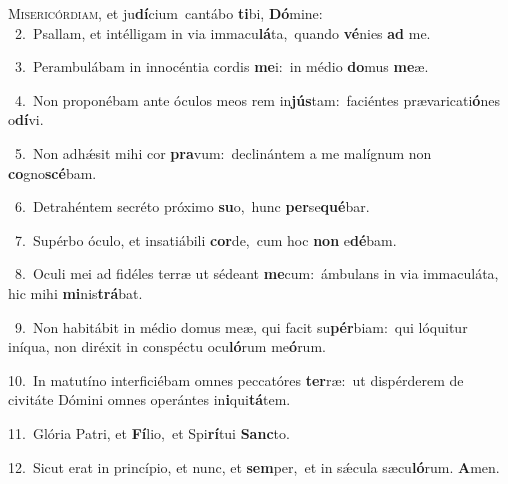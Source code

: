 \lettrine{\initial\textcolor{\initialcolor}{M}}{isericórdiam,} et ju\-\textbf{dí}\-cium~\star cantábo \textbf{ti}\-bi, \textbf{Dó}\-mine:\\
{\numbfont\textcolor{\numbcolor}{~2.}}~Psallam, et intélligam in via immacu\-\textbf{lá}\-ta,~\star quando \textbf{vé}\-nies \textbf{ad} me.\par
{\numbfont\textcolor{\numbcolor}{~3.}}~Perambulábam in innocéntia cordis \textbf{me}\-i:~\star in médio \textbf{do}\-mus \textbf{me}\-æ.\par
{\numbfont\textcolor{\numbcolor}{~4.}}~Non proponébam ante óculos meos rem in\-\textbf{jús}\-tam:~\star faciéntes prævaricati\-\textbf{ó}\-nes o\-\textbf{dí}\-vi.\par
{\numbfont\textcolor{\numbcolor}{~5.}}~Non adhǽsit mihi cor \textbf{pra}\-vum:~\star declinántem a me malígnum non \textbf{co}\-gno\-\textbf{scé}\-bam.\par
{\numbfont\textcolor{\numbcolor}{~6.}}~Detrahéntem secréto próximo \textbf{su}\-o,~\star hunc \textbf{per}\-se\-\textbf{qué}\-bar.\par
{\numbfont\textcolor{\numbcolor}{~7.}}~Supérbo óculo, et insatiábili \textbf{cor}\-de,~\star cum hoc \textbf{non} e\-\textbf{dé}\-bam.\par
{\numbfont\textcolor{\numbcolor}{~8.}}~Oculi mei ad fidéles terræ ut sédeant \textbf{me}\-cum:~\star ámbulans in via immaculáta, hic mihi \textbf{mi}\-nis\-\textbf{trá}\-bat.\par
{\numbfont\textcolor{\numbcolor}{~9.}}~Non habitábit in médio domus meæ, qui facit su\-\textbf{pér}\-biam:~\star qui lóquitur iníqua, non diréxit in conspéctu ocu\-\textbf{ló}\-rum me\-\textbf{ó}\-rum.\par
{\numbfont\textcolor{\numbcolor}{10.}}~In matutíno interficiébam omnes peccatóres \textbf{ter}\-ræ:~\star ut dispérderem de civitáte Dómini omnes operántes in\-\textbf{i}\-qui\-\textbf{tá}\-tem.\par
{\numbfont\textcolor{\numbcolor}{11.}}~Glória Patri, et \textbf{Fí}\-lio,~\star et Spi\-\textbf{rí}\-tui \textbf{Sanc}\-to.\par
{\numbfont\textcolor{\numbcolor}{12.}}~Sicut erat in princípio, et nunc, et \textbf{sem}\-per,~\star et in sǽcula sæcu\-\textbf{ló}\-rum. \textbf{A}\-men.\par
